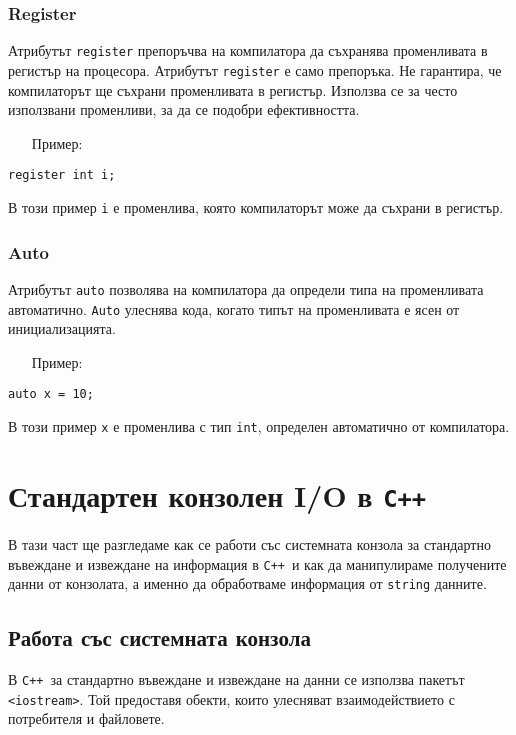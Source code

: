 \documentclass[oneside]{book}
\newcommand*{\code}[1]{\texttt{#1}}
\newcommand*{\cpp}{\texttt{C++}\ }
\begin{document}
\subsubsection{Register}
Атрибутът \code{register} препоръчва на компилатора да съхранява променливата в регистър на процесора. Атрибутът \code{register} е само препоръка. Не гарантира, че компилаторът ще съхрани променливата в регистър. Използва се за често използвани променливи, за да се подобри ефективността.
\pagebreak
\begin{itemize}\item[Пример:]\end{itemize} 
\begin{mdframed}\begin{lstlisting}
register int i;
\end{lstlisting}\end{mdframed}
В този пример \code{i} е променлива, която компилаторът може да съхрани в регистър.

\subsubsection{Auto}
Атрибутът \code{auto} позволява на компилатора да определи типа на променливата автоматично. \code{Auto} улеснява кода, когато типът на променливата е ясен от инициализацията.

\begin{itemize}\item[Пример:]\end{itemize} 
\begin{mdframed}\begin{lstlisting}
auto x = 10;
\end{lstlisting}\end{mdframed}
В този пример \code{x} е променлива с тип \code{int}, определен автоматично от компилатора.

\section{Стандартен конзолен I/O в \cpp}
В тази част ще разгледаме как се работи със системната конзола за стандартно въвеждане и извеждане на информация в \cpp и как да манипулираме получените данни от конзолата, а именно да обработваме информация от \code{string} данните.
\subsection{Работа със системната конзола}
В \cpp за стандартно въвеждане и извеждане на данни се използва пакетът \code{<iostream>}. Той предоставя обекти, които улесняват взаимодействието с потребителя и файловете.
\end{document}
